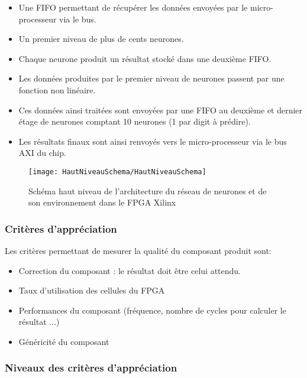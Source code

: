\begin{itemize}
	\item Une FIFO permettant de récupérer les données envoyées par le micro-processeur via le bus.
	\item Un premier niveau de plus de cents neurones.
	\item Chaque neurone produit un résultat stocké dans une deuxième FIFO.
	\item Les données produites par le premier niveau de neurones passent par une fonction non linéaire.
	\item Ces données ainsi traitées sont envoyées par une FIFO au deuxième et dernier étage de neurones comptant 10 neurones (1 par digit à prédire).
	\item Les résultats finaux sont ainsi renvoyés vers le micro-processeur via le bus AXI du chip.
\end{itemize}
	

\begin{figure}[htbp]
\begin{center}
\texttt{[image: HautNiveauSchema/HautNiveauSchema]}
\caption{Schéma haut niveau de l'architecture du réseau de neurones et de son environnement dans le FPGA Xilinx}
\label{fig:NN}
\end{center}
\end{figure}

\subsubsection{Critères d’appréciation}

Les critères permettant de mesurer la qualité du composant produit sont:
\begin{itemize}
	\item Correction du composant : le résultat doit être celui attendu.
	\item Taux d'utilisation des cellules du FPGA
	\item Performances du composant (fréquence, nombre de cycles pour
		calculer le résultat ...)
	\item Généricité du composant
\end{itemize}

\subsubsection{Niveaux des critères d’appréciation}

